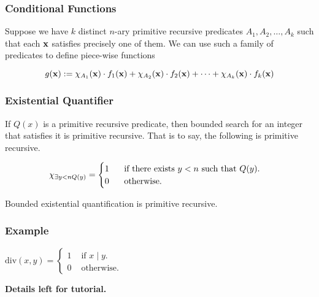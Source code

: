 \documentclass{beamer}
\begin{document}
\begin{frame}
	\frametitle{Conditional Functions}

	Suppose we have $k$ distinct $n$-ary primitive recursive predicates $A_{1}, A_{2},\dots , A_{k}$ such that each ${\bf x}$ satisfies precisely one of them. We can use such a family of predicates to define piece-wise functions

	\vspace{0.5cm}

	$$g({\bf x}):= \chi_{A_{1}}({\bf x}) \cdot f_{1}({\bf x}) + \chi_{A_{2}}({\bf x}) \cdot f_{2}({\bf x}) + \cdots + \chi_{A_{k}}({\bf x}) \cdot f_{k}({\bf x})$$

	\vspace{6cm}


\end{frame}


\begin{frame}
	\frametitle{Existential Quantifier}

	If $Q(x)$ is a primitive recursive predicate, then bounded search for an integer that satisfies it is primitive recursive. That is to say, the following is primitive recursive.

	$$\chi_{\exists y < n Q(y)} =  \begin{cases}
		1 \hspace{0.5cm} \text{ if there exists } y < n \text{ such that } Q(y).\\
		0 \hspace{0.5cm} \text{ otherwise. }
	\end{cases}   $$

	\vspace{0.5cm}

	Bounded existential quantification is primitive recursive.

	\vspace{3cm}

\end{frame}

\begin{frame}
	\frametitle{Example}

	 $\text{div}(x,y) = 
	 \begin{cases}
		1 & \text{ if } x\mid y. \\
		0 & \text{ otherwise. }
	 \end{cases}$
	
	\vspace{6cm}

	\hspace{6cm} {\bf Details left for tutorial.}

\end{frame}
\end{document}
